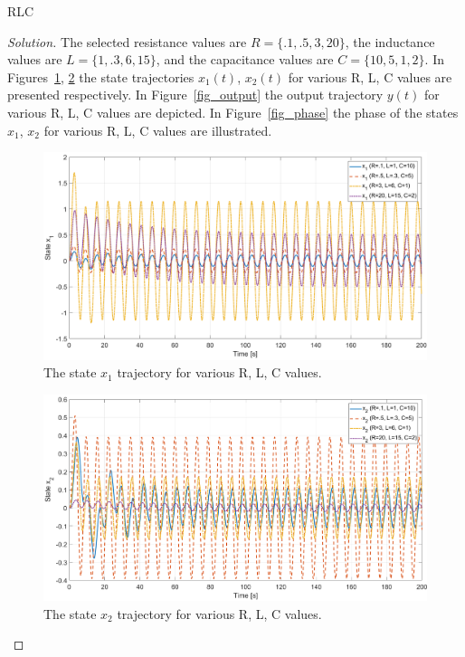 \documentclass[12pt]{article}
\newenvironment{problem}[2][Problem]{\begin{trivlist}
\item[\hskip \labelsep {\bfseries #1}\hskip \labelsep {\bfseries #2.}]}{\end{trivlist}}
\newenvironment{solution}{\begin{proof}[Solution]}{\end{proof}}
\begin{document}
\begin{problem}{1.1.2} %
RLC
\end{problem}
\begin{solution}
The selected resistance values are $R=\{ .1, .5, 3, 20 \}$, the inductance values are $L=\{1 , .3, 6 , 15 \}$, and the capacitance values are $C=\{10 , 5, 1 , 2 \}$. In Figures~\ref{fig_state1}, \ref{fig_state2} the state trajectories  $x_1(t)$, $x_2(t)$ for various R, L, C values are presented respectively. In Figure~\ref{fig_output} the output trajectory $y(t)$ for various R, L, C values are depicted. In Figure~\ref{fig_phase} the phase of the states $x_1$, $x_2$ for various R, L, C values are illustrated.
  
\begin{figure}[!h]
	\includegraphics[width=.9\columnwidth]{figures/1_1_2_state_1.png}
	\centering
	\caption{The state $x_1$ trajectory for various R, L, C values.}
	\label{fig_state1}
\end{figure}
\begin{figure}[!h]
	\includegraphics[width=.9\columnwidth]{figures/1_1_2_state_2.png}
	\centering
	\caption{The state $x_2$ trajectory for various R, L, C values.}
	\label{fig_state2}
\end{figure}
\begin{figure}[!h]

\end{figure}
\end{solution}
\end{document}
